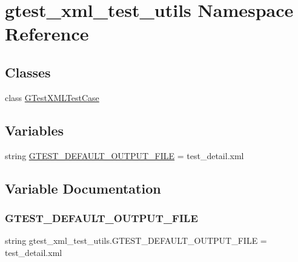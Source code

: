 \hypertarget{namespacegtest__xml__test__utils}{}\section{gtest\+\_\+xml\+\_\+test\+\_\+utils Namespace Reference}
\label{namespacegtest__xml__test__utils}
\subsection*{Classes}
\begin{DoxyCompactItemize}
\item 
class \mbox{\hyperlink{classgtest__xml__test__utils_1_1_g_test_x_m_l_test_case}{G\+Test\+X\+M\+L\+Test\+Case}}
\end{DoxyCompactItemize}
\subsection*{Variables}
\begin{DoxyCompactItemize}
\item 
string \mbox{\hyperlink{namespacegtest__xml__test__utils_aebe969ed368778716d0619214ff7b853}{G\+T\+E\+S\+T\+\_\+\+D\+E\+F\+A\+U\+L\+T\+\_\+\+O\+U\+T\+P\+U\+T\+\_\+\+F\+I\+LE}} = \textquotesingle{}test\+\_\+detail.\+xml\textquotesingle{}
\end{DoxyCompactItemize}


\subsection{Variable Documentation}
\mbox{\label{namespacegtest__xml__test__utils_aebe969ed368778716d0619214ff7b853}} 
\subsubsection{\texorpdfstring{GTEST\_DEFAULT\_OUTPUT\_FILE}{GTEST\_DEFAULT\_OUTPUT\_FILE}}
{\footnotesize\ttfamily string gtest\+\_\+xml\+\_\+test\+\_\+utils.\+G\+T\+E\+S\+T\+\_\+\+D\+E\+F\+A\+U\+L\+T\+\_\+\+O\+U\+T\+P\+U\+T\+\_\+\+F\+I\+LE = \textquotesingle{}test\+\_\+detail.\+xml\textquotesingle{}}

